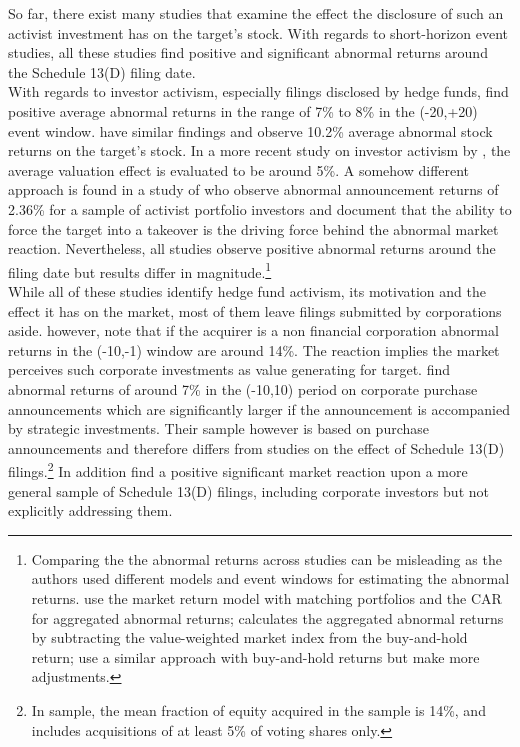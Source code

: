 \documentclass[12pt]{article}
\begin{document}
So far, there exist many studies that examine the effect the disclosure of such an activist investment has on the target's stock. With regards to short-horizon event studies, all these studies find positive and significant abnormal returns around the Schedule 13(D) filing date.\\ 
With regards to investor activism, especially filings disclosed by hedge funds, \citet[p.1730]{Brav2008} find positive average abnormal returns in the range of 7\% to 8\% in the (-20,+20) event window. \citet[p.188]{Klein2009} have similar findings and observe 10.2\% average abnormal stock returns on the target's stock. In a more recent study on investor activism by \citet[p.410]{Denes2017}, the average valuation effect is evaluated to be around 5\%. A somehow different approach is found in a study of \citet[p.363]{Greenwood2009} who observe abnormal announcement returns of 2.36\% for a sample of activist portfolio investors and document that the ability to force the target into a takeover is the driving force behind the abnormal market reaction. Nevertheless, all studies observe positive abnormal returns around the filing date but results differ in magnitude.\footnote{Comparing the the abnormal returns across studies can be misleading as the authors used different models and event windows for estimating the abnormal returns. \citet{Greenwood2009} use the market return model with matching portfolios and the CAR for aggregated abnormal returns; \citet{Brav2008} calculates the aggregated abnormal returns by subtracting the value-weighted market index from the buy-and-hold return; \citet{Klein2009} use a similar approach with buy-and-hold returns but make more adjustments.}\\
While all of these studies identify hedge fund activism, its motivation and the effect it has on the market, most of them leave filings submitted by corporations aside. \citet[p.29]{Brigida2012} however, note that if the acquirer is a non financial corporation abnormal returns in the (-10,-1) window are around 14\%. The reaction implies the market perceives such corporate investments as value generating for target. \citet[p.2803]{Allen2000} find abnormal returns of around 7\% in the (-10,10) period on corporate purchase announcements which are significantly larger if the announcement is accompanied by strategic investments. Their sample however is based on purchase announcements and therefore differs from studies on the effect of Schedule 13(D) filings.\footnote{In \citet[p.2801]{Allen2000} sample, the mean fraction of equity acquired in the sample is 14\%, and includes acquisitions of at least 5\% of voting shares only.} In addition \citet{Collin-Dufresne2015} find a positive significant market reaction upon a more general sample of Schedule 13(D) filings, including corporate investors but not explicitly addressing them.\\
\end{document}
